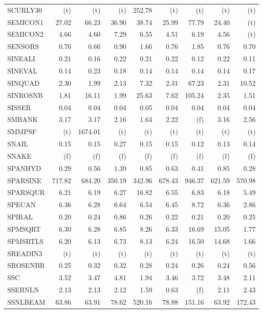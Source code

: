 \documentclass[11pt,twoside]{article}
\begin{document}
{\begin{longtable}[c]{|l|r|r|r|r|r|r|r|r|}
SCURLY30 & (t) & (t) & (t) & 252.78 & (t) & (t) & (t) & (t) \\
SEMICON1 & 27.02 & 66.23 & 36.90 & 38.74 & 25.99 & 77.79 & 24.40 & (t) \\
SEMICON2 & 4.66 & 4.60 & 7.29 & 6.55 & 4.51 & 6.19 & 4.56 & (t) \\
SENSORS & 0.76 & 0.66 & 0.90 & 1.66 & 0.76 & 1.85 & 0.76 & 0.70 \\
SINEALI & 0.21 & 0.16 & 0.22 & 0.21 & 0.22 & 0.12 & 0.22 & 0.11 \\
SINEVAL & 0.14 & 0.23 & 0.18 & 0.14 & 0.14 & 0.14 & 0.14 & 0.17 \\
SINQUAD & 2.30 & 1.99 & 2.13 & 7.32 & 2.31 & 67.23 & 2.31 & 10.52 \\
SINROSNB & 1.81 & 16.11 & 1.99 & 25.63 & 7.62 & 105.24 & 2.35 & 1.51 \\
SISSER & 0.04 & 0.04 & 0.04 & 0.05 & 0.04 & 0.04 & 0.04 & 0.04 \\
SMBANK & 3.17 & 3.17 & 2.16 & 1.64 & 2.22 & (f) & 3.16 & 2.56 \\
SMMPSF & (t) & 1674.01 & (t) & (t) & (t) & (t) & (t) & (t) \\
SNAIL & 0.15 & 0.15 & 0.27 & 0.15 & 0.15 & 0.12 & 0.13 & 0.14 \\
SNAKE & (f) & (f) & (f) & (f) & (f) & (f) & (f) & (f) \\
SPANHYD & 0.29 & 0.56 & 1.39 & 0.85 & 0.63 & 0.41 & 0.85 & 0.28 \\
SPARSINE & 717.82 & 684.20 & 350.19 & 342.96 & 678.43 & 946.37 & 621.59 & 570.98 \\
SPARSQUR & 6.21 & 6.19 & 6.27 & 16.82 & 6.55 & 6.83 & 6.18 & 5.49 \\
SPECAN & 6.36 & 6.28 & 6.64 & 6.54 & 6.45 & 8.72 & 6.36 & 2.86 \\
SPIRAL & 0.20 & 0.24 & 0.86 & 0.26 & 0.22 & 0.21 & 0.20 & 0.25 \\
SPMSQRT & 6.30 & 6.28 & 6.85 & 8.26 & 6.33 & 16.69 & 15.05 & 1.77 \\
SPMSRTLS & 6.20 & 6.13 & 6.73 & 8.13 & 6.24 & 16.50 & 14.68 & 1.66 \\
SREADIN3 & (t) & (t) & (t) & (t) & (t) & (t) & (t) & (t) \\
SROSENBR & 0.25 & 0.32 & 0.32 & 0.28 & 0.24 & 0.26 & 0.24 & 0.56 \\
SSC & 3.52 & 3.47 & 4.81 & 1.94 & 3.46 & 3.72 & 3.48 & 2.11 \\
SSEBNLN & 2.13 & 2.13 & 2.12 & 1.59 & 0.63 & (f) & 2.11 & 2.43 \\
SSNLBEAM & 63.86 & 63.91 & 78.62 & 520.16 & 78.88 & 151.16 & 63.92 & 172.43 \\

\end{longtable}}
\end{document}
